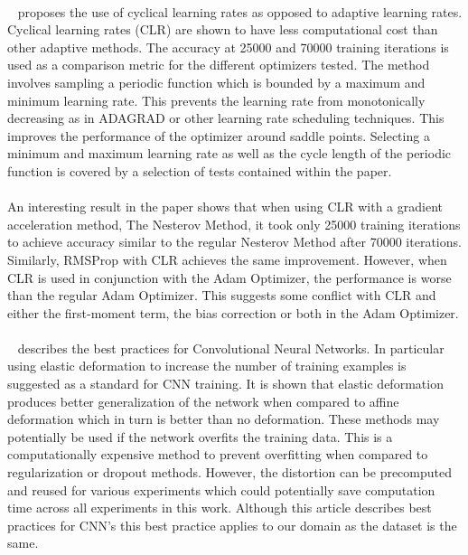 \documentclass{article}
\begin{document}
\paragraph{}~\citet{smith2017cyclical} proposes  the use of cyclical learning rates as opposed to adaptive learning rates. Cyclical learning rates (CLR) are shown to have less computational cost than other adaptive methods.  The accuracy at 25000 and 70000 training iterations is used as a comparison metric for the different optimizers tested.
The method involves sampling a periodic function which is bounded by a maximum and minimum learning rate. This prevents the learning rate from monotonically decreasing as in ADAGRAD or other learning rate scheduling techniques. This improves the performance of the optimizer around saddle points. Selecting a minimum and maximum learning rate as well as the cycle length of the periodic function is covered by a selection of tests contained within the paper. 

\paragraph{}An interesting result in the paper shows that when using CLR with a gradient acceleration method, The Nesterov Method, it took only 25000 training iterations to achieve accuracy similar to the regular Nesterov Method after 70000 iterations. Similarly, RMSProp with CLR achieves the same improvement. However, when CLR is used in conjunction with the Adam Optimizer, the performance is worse than the regular Adam Optimizer. This suggests some conflict with CLR and either the first-moment term, the bias correction or both in the Adam Optimizer.

\paragraph{}~\citet{Simard2003BestPF} describes the best practices for Convolutional Neural Networks. In particular using elastic deformation to increase the number of training examples is suggested as a standard for CNN training. It is shown that elastic deformation produces better generalization of the network when compared to affine deformation which in turn is better than no deformation. These methods may potentially be used if the network overfits the training data. This is a computationally expensive method to prevent overfitting when compared to regularization or dropout methods. However, the distortion can be precomputed and reused for various experiments which could potentially save computation time across all experiments in this work. Although this article describes best practices for CNN's this best practice applies to our domain as the dataset is the same.
\end{document}
